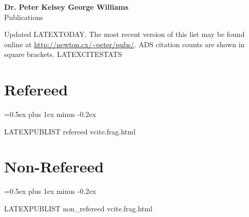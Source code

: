 \documentclass[letterpaper,11pt]{article}
\newenvironment{publist}{
  \begingroup
  \raggedright
  \parskip=0.5ex plus 1ex minus -0.2ex
}{
  \endgroup
}
\begin{document}
\pagestyle{fancy}
\lhead{} \chead{} \rhead{} \renewcommand{\headrule}{\relax}
\cfoot{\thepage/\pageref*{LastPage}}

\begin{center}
\textbf{\Large Dr. Peter Kelsey George Williams} \\
{\large Publications}
\end{center}

\noindent Updated
LATEXTODAY.
The most recent version of this list may be found online at
\url{http://newton.cx/~peter/pubs/}. ADS citation counts are shown in square
brackets.
LATEXCITESTATS

\section*{Refereed}

\begin{publist}
LATEXPUBLIST refereed vcite.frag.html
\end{publist}

\section*{Non-Refereed}

\begin{publist}
LATEXPUBLIST non_refereed vcite.frag.html
\end{publist}
\end{document}
